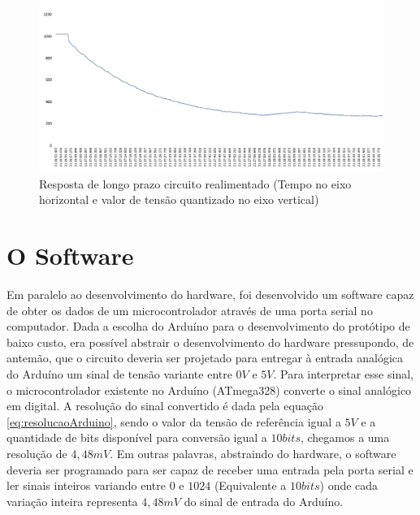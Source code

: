 \begin{figure}[h!]
	\begin{center}
		\includegraphics[width=1\linewidth]{images/DecaimentoRespiracaoMascara.png}
		\caption{Resposta de longo prazo circuito realimentado (Tempo no eixo horizontal e valor de tensão quantizado no eixo vertical)}
		\label{fig:RespostaCircuitoRealimentadoLongoPrazo}
	\end{center}
\end{figure}
\FloatBarrier



 
 
\section{O Software}

Em paralelo ao desenvolvimento do hardware, foi desenvolvido um software capaz de obter os dados de um microcontrolador através de uma porta serial no computador. Dada a escolha do Arduíno para o desenvolvimento do protótipo de baixo custo, era possível abstrair o desenvolvimento do hardware pressupondo, de antemão, que o circuito deveria ser projetado para entregar à entrada analógica do Arduíno um sinal de tensão variante entre $0V$ e $5V$. Para interpretar esse sinal, o microcontrolador existente no Arduíno (ATmega328) converte o sinal analógico em digital. A resolução do sinal convertido é dada pela equação \ref{eq:resolucaoArduino}, sendo o valor da tensão de referência igual a $5V$ e a quantidade de bits disponível para conversão igual a $10bits$, chegamos a uma resolução de $4,48mV$. Em outras palavras, abstraindo do hardware, o software deveria ser programado para ser capaz de receber uma entrada pela porta serial e ler sinais inteiros variando entre  $0$ e $1024$ (Equivalente a $10bits$) onde cada variação inteira representa $4,48mV$ do sinal de entrada do Arduíno.


